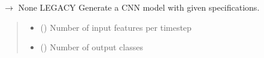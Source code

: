 \documentclass[letterpaper,10pt,english]{sphinxmanual}
\begin{document}
\begin{fulllineitems}
\label{\detokenize{autoapi/src/CNNTrainer/index:src.CNNTrainer.__model_generator}}
\pysigstartsignatures
\pysiglinewithargsret
{}
{\sphinxparamcomma {}}
{{ $\rightarrow$ None}}
\pysigstopsignatures
\sphinxAtStartPar
LEGACY \sphinxhyphen{} Generate a CNN model with given specifications.
\begin{quote}\begin{description}
\begin{itemize}
\item {} 
\sphinxAtStartPar
{} () \textendash{} Number of input features per timestep

\item {} 
\sphinxAtStartPar
{} () \textendash{} Number of output classes

\end{itemize}

\end{description}\end{quote}

\end{fulllineitems}

\end{document}
